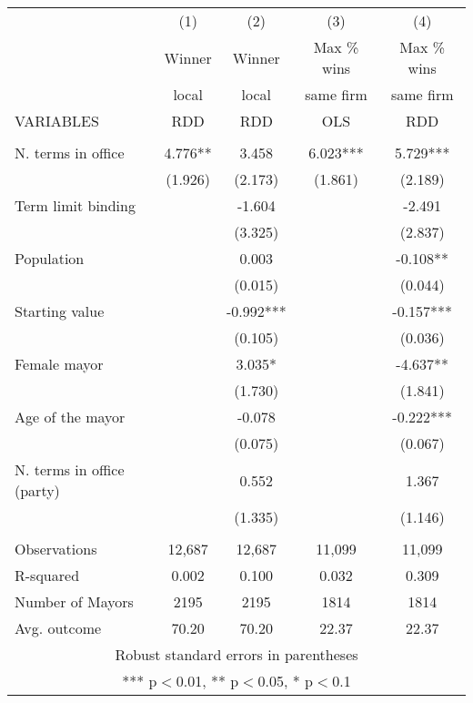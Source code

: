 \documentclass[]{article}
\begin{document}
\begin{tabular}{lcccc} \hline
 & (1) & (2) & (3) & (4) \\
 & Winner & Winner & Max \% wins & Max \% wins \\
 & local & local & same firm & same firm \\
VARIABLES & RDD & RDD & OLS & RDD \\ \hline
 &  &  &  &  \\
N. terms in office & 4.776** & 3.458 & 6.023*** & 5.729*** \\
 & (1.926) & (2.173) & (1.861) & (2.189) \\
Term limit binding &  & -1.604 &  & -2.491 \\
 &  & (3.325) &  & (2.837) \\
Population &  & 0.003 &  & -0.108** \\
 &  & (0.015) &  & (0.044) \\
Starting value &  & -0.992*** &  & -0.157*** \\
 &  & (0.105) &  & (0.036) \\
Female mayor &  & 3.035* &  & -4.637** \\
 &  & (1.730) &  & (1.841) \\
Age of the mayor &  & -0.078 &  & -0.222*** \\
 &  & (0.075) &  & (0.067) \\
N. terms in office (party) &  & 0.552 &  & 1.367 \\
 &  & (1.335) &  & (1.146) \\
 &  &  &  &  \\
Observations & 12,687 & 12,687 & 11,099 & 11,099 \\
R-squared & 0.002 & 0.100 & 0.032 & 0.309 \\
Number of Mayors & 2195 & 2195 & 1814 & 1814 \\
 Avg. outcome & 70.20 & 70.20 & 22.37 & 22.37 \\ \hline
\multicolumn{5}{c}{ Robust standard errors in parentheses} \\
\multicolumn{5}{c}{ *** p$<$0.01, ** p$<$0.05, * p$<$0.1} \\
\end{tabular}
\end{document}
